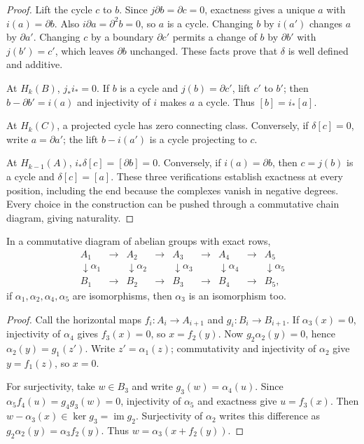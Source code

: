 \begin{proof}
Lift the cycle $c$ to $b$. Since $j\partial b=\partial c=0$, exactness gives a unique $a$ with $i(a)=\partial b$. Also $i\partial a=\partial^2b=0$, so $a$ is a cycle. Changing $b$ by $i(a')$ changes $a$ by $\partial a'$. Changing $c$ by a boundary $\partial c'$ permits a change of $b$ by $\partial b'$ with $j(b')=c'$, which leaves $\partial b$ unchanged. These facts prove that $\delta$ is well defined and additive.

At $H_k(B)$, $j_*i_*=0$. If $b$ is a cycle and $j(b)=\partial c'$, lift $c'$ to $b'$; then $b-\partial b'=i(a)$ and injectivity of $i$ makes $a$ a cycle. Thus $[b]=i_*[a]$.

At $H_k(C)$, a projected cycle has zero connecting class. Conversely, if $\delta[c]=0$, write $a=\partial a'$; the lift $b-i(a')$ is a cycle projecting to $c$.

At $H_{k-1}(A)$, $i_*\delta[c]=[\partial b]=0$. Conversely, if $i(a)=\partial b$, then $c=j(b)$ is a cycle and $\delta[c]=[a]$. These three verifications establish exactness at every position, including the end because the complexes vanish in negative degrees. Every choice in the construction can be pushed through a commutative chain diagram, giving naturality.
\end{proof}

\begin{lemma}\label{lem:five}
In a commutative diagram of abelian groups with exact rows,
\[
\begin{array}{ccccccccc}
A_1&\to&A_2&\to&A_3&\to&A_4&\to&A_5\\
\downarrow\alpha_1&&\downarrow\alpha_2&&\downarrow\alpha_3&&\downarrow\alpha_4&&\downarrow\alpha_5\\
B_1&\to&B_2&\to&B_3&\to&B_4&\to&B_5,
\end{array}
\]
if $\alpha_1,\alpha_2,\alpha_4,\alpha_5$ are isomorphisms, then $\alpha_3$ is an isomorphism too.
\end{lemma}

\begin{proof}
Call the horizontal maps $f_i:A_i\to A_{i+1}$ and $g_i:B_i\to B_{i+1}$. If $\alpha_3(x)=0$, injectivity of $\alpha_4$ gives $f_3(x)=0$, so $x=f_2(y)$. Now $g_2\alpha_2(y)=0$, hence $\alpha_2(y)=g_1(z')$. Write $z'=\alpha_1(z)$; commutativity and injectivity of $\alpha_2$ give $y=f_1(z)$, so $x=0$.

For surjectivity, take $w\in B_3$ and write $g_3(w)=\alpha_4(u)$. Since $\alpha_5f_4(u)=g_4g_3(w)=0$, injectivity of $\alpha_5$ and exactness give $u=f_3(x)$. Then $w-\alpha_3(x)\in\ker g_3=\operatorname{im}g_2$. Surjectivity of $\alpha_2$ writes this difference as $g_2\alpha_2(y)=\alpha_3f_2(y)$. Thus $w=\alpha_3(x+f_2(y))$.
\end{proof}

